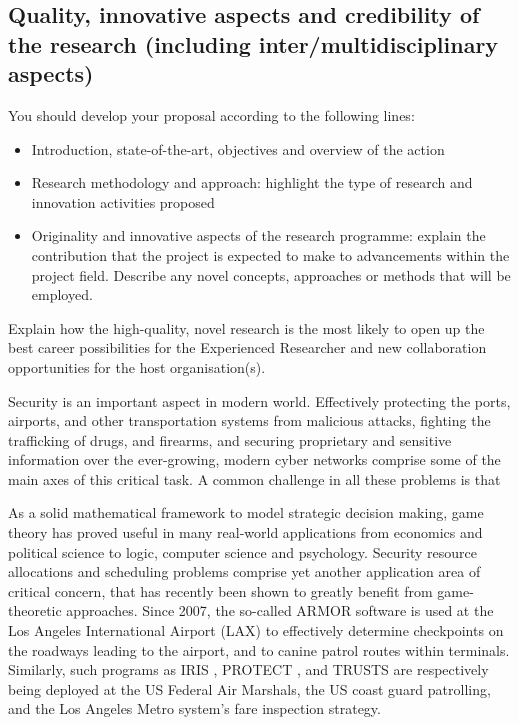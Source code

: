 
\subsection{Quality, innovative aspects and credibility of the research (including inter/multidisciplinary aspects)}
\label{sec:quality}

You should develop your proposal according to the following lines:
\begin{itemize}
\item Introduction, state-of-the-art, objectives and overview of the action
\item Research methodology and approach: highlight the type of research and innovation activities proposed
\item Originality and innovative aspects of the research programme: explain the contribution that the project is expected to make to advancements within the project field. Describe any novel concepts, approaches or methods that will be employed.
\end{itemize}
Explain how the high-quality, novel research is the most likely to open up the best career possibilities for the Experienced Researcher and new collaboration opportunities for the host organisation(s).



Security is an important aspect in modern world.
Effectively protecting the ports, airports, and other transportation systems from malicious attacks,
fighting the trafficking of drugs, and firearms, and securing proprietary and sensitive information over the ever-growing, modern cyber networks comprise some of the main axes of this critical task.
A common challenge in all these problems is that 

As a solid mathematical framework to model strategic decision making, game theory has proved useful in many real-world applications from economics and political science to logic, computer science and psychology. 
Security resource allocations and scheduling problems comprise yet another application area of critical concern, that has recently been shown to greatly benefit from game-theoretic approaches.
Since 2007, the so-called ARMOR software \cite{pita2008deployed} is used at the Los Angeles International Airport (LAX) to effectively determine 
checkpoints on the roadways leading to the airport, and to canine patrol routes within terminals. 
Similarly, such programs as IRIS \cite{tsai2009iris}, PROTECT \cite{shieh2012protect}, and TRUSTS \cite{yin2012trusts} are respectively being deployed at the US Federal Air Marshals, the US coast guard patrolling, and the Los Angeles Metro system's fare inspection strategy.

